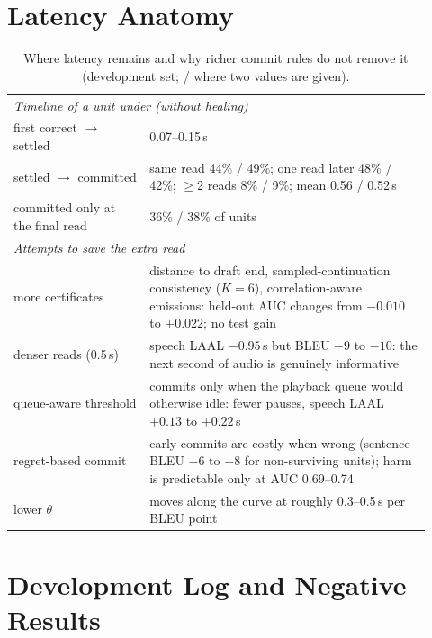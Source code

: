 \section{Latency Anatomy}
\label{app:anatomy}

\begin{table}[h]
\centering
\caption{Where latency remains and why richer commit rules do not remove it (development set; \enzh{} / \zhen{} where two values are given).}
\label{tab:anatomy}
\small
\setlength{\tabcolsep}{4pt}
\begin{tabular}{p{0.30\linewidth}p{0.62\linewidth}}
\toprule
\multicolumn{2}{l}{\textit{Timeline of a unit under \ours{} (without healing)}} \\
first correct $\rightarrow$ settled & 0.07--0.15\,s \\
settled $\rightarrow$ committed & same read 44\% / 49\%; one read later 48\% / 42\%; $\ge$2 reads 8\% / 9\%; mean 0.56 / 0.52\,s \\
committed only at the final read & 36\% / 38\% of units \\
\midrule
\multicolumn{2}{l}{\textit{Attempts to save the extra read}} \\
more certificates & distance to draft end, sampled-continuation consistency ($K{=}6$), correlation-aware emissions: held-out AUC changes from $-0.010$ to $+0.022$; no test gain \\
denser reads (0.5\,s) & speech LAAL $-0.95$\,s but BLEU $-9$ to $-10$: the next second of audio is genuinely informative \\
queue-aware threshold & commits only when the playback queue would otherwise idle: fewer pauses, speech LAAL $+0.13$ to $+0.22$\,s \\
regret-based commit & early commits are costly when wrong (sentence BLEU $-6$ to $-8$ for non-surviving units); harm is predictable only at AUC 0.69--0.74 \\
lower $\theta$ & moves along the curve at roughly 0.3--0.5\,s per BLEU point \\
\bottomrule
\end{tabular}
\end{table}

\section{Development Log and Negative Results}
\label{app:negative}

